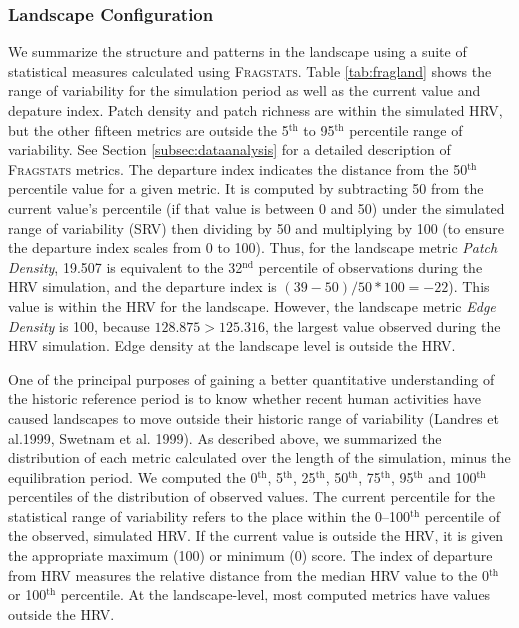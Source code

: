 \subsubsection{Landscape Configuration}
We summarize the structure and patterns in the landscape using a suite of statistical measures calculated using \textsc{Fragstats}. Table \ref{tab:fragland} shows the range of variability for the simulation period as well as the current value and depature index. Patch density and patch richness are within the simulated HRV, but the other fifteen metrics are outside the 5$^{\text{th}}$ to 95$^{\text{th}}$ percentile range of variability. See Section \ref{subsec:dataanalysis} for a detailed description of \textsc{Fragstats} metrics.
The departure index indicates the distance from the 50$^{\text{th}}$ percentile value for a given metric. It is computed by subtracting 50 from the current value's percentile (if that value is between 0 and 50) under the simulated range of variability (SRV) then dividing by 50 and multiplying by 100 (to ensure the departure index scales from 0 to 100). Thus, for the landscape metric \emph{Patch Density}, 19.507 is equivalent to the 32$^{\text{nd}}$ percentile of observations during the HRV simulation, and the departure index is $(39-50)/50*100 = -22$). This value is within the HRV for the landscape. However, the landscape metric \emph{Edge Density} is 100, because $128.875 > 125.316$, the largest value observed during the HRV simulation. Edge density at the landscape level is outside the HRV.

One of the principal purposes of gaining a better quantitative understanding of the historic reference period is to know whether recent human activities have caused landscapes to move outside their historic range of variability (Landres et al.1999, Swetnam et al. 1999). As described above, we summarized the distribution of each metric calculated over the length of the simulation, minus the equilibration period. We computed the 0$^{\text{th}}$, 5$^{\text{th}}$, 25$^{\text{th}}$, 50$^{\text{th}}$, 75$^{\text{th}}$, 95$^{\text{th}}$ and 100$^{\text{th}}$ percentiles of the distribution of observed values. The current percentile for the statistical range of variability refers to the place within the 0--100$^{\text{th}}$ percentile of the observed, simulated HRV. If the current value is outside the HRV, it is given the appropriate maximum (100) or minimum (0) score. The index of departure from HRV measures the relative distance from the median HRV value to the 0$^{\text{th}}$ or 100$^{\text{th}}$ percentile. At the landscape-level, most computed metrics have values outside the HRV. 

